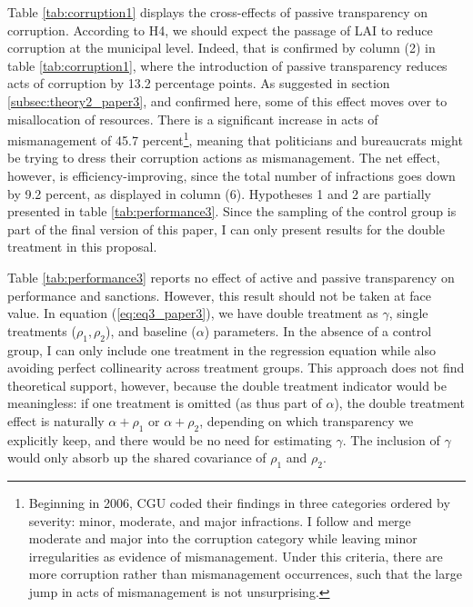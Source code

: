 \documentclass[11pt]{article}
\newcommand{\refp}[1]{(\ref{#1})}
\begin{document}
Table \ref{tab:corruption1} displays the cross-effects of passive transparency on corruption. According to H4, we should expect the passage of LAI to reduce corruption at the municipal level. Indeed, that is confirmed by column (2) in table \ref{tab:corruption1}, where the introduction of passive transparency reduces acts of corruption by 13.2 percentage points. As suggested in section \ref{subsec:theory2_paper3}, and confirmed here, some of this effect moves over to misallocation of resources. There is a significant increase in acts of mismanagement of 45.7 percent\footnote{Beginning in 2006, CGU coded their findings in three categories ordered by severity: minor, moderate, and major infractions. I follow \citet{AvisGovernmentAuditsReduce2018} and merge moderate and major into the corruption category while leaving minor irregularities as evidence of mismanagement. Under this criteria, there are more corruption rather than mismanagement occurrences, such that the large jump in acts of mismanagement is not unsurprising.}, meaning that politicians and bureaucrats might be trying to dress their corruption actions as mismanagement. The net effect, however, is efficiency-improving, since the total number of infractions goes down by 9.2 percent, as displayed in column (6).
\clearpage
Hypotheses 1 and 2 are partially presented in table \ref{tab:performance3}. Since the sampling of the control group is part of the final version of this paper, I can only present results for the double treatment in this proposal.



Table \ref{tab:performance3} reports no effect of active and passive transparency on performance and sanctions. However, this result should not be taken at face value. In equation \refp{eq:eq3_paper3}, we have double treatment as $\gamma$, single treatments ($\rho_{1}, \rho_{2}$), and baseline  ($\alpha$) parameters. In the absence of a control group, I can only include one treatment in the regression equation while also avoiding perfect collinearity across treatment groups. This approach does not find theoretical support, however, because the double treatment indicator would be meaningless: if one treatment is omitted (as thus part of $\alpha$), the double treatment effect is naturally $\alpha + \rho_{1}$ or $\alpha + \rho_{2}$, depending on which transparency we explicitly keep, and there would be no need for estimating $\gamma$. The inclusion of $\gamma$ would only absorb up the shared covariance of $\rho_{1}$ and $\rho_{2}$.
\end{document}
